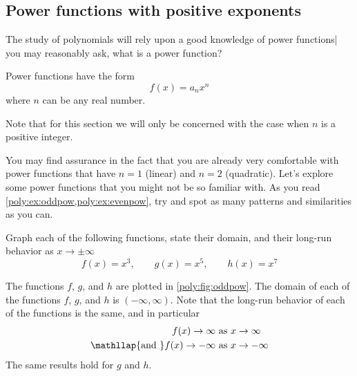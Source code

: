  \subsection*{Power functions with positive exponents}
	 The study of polynomials will rely upon a good knowledge
	 of power functions| you may reasonably ask, what is a power function?
	 \begin{pccdefinition}
		 Power functions have the form
		 \[
			 f(x) = a_n x^n
		 \]
		 where $n$ can be any real number.

		 Note that for this section we will only be concerned with the
		 case when $n$ is a positive integer.
	 \end{pccdefinition}

	 You may find assurance in the fact that you are already very comfortable
	 with power functions that have $n=1$ (linear) and $n=2$ (quadratic). Let's
	 explore some power functions that you might not be so familiar with.
	 As you read \cref{poly:ex:oddpow,poly:ex:evenpow}, try and spot
	 as many patterns and similarities as you can.

	 \begin{pccexample}
		 \label{poly:ex:oddpow}
		 Graph each of the following functions, state their domain, and their
		 long-run behavior as $x\rightarrow\pm\infty$
		 \[
			 f(x)=x^3,   \qquad  g(x)=x^5, \qquad h(x)=x^7
		 \]
		 \begin{pccsolution}
			 The functions $f$, $g$, and $h$ are plotted in \cref{poly:fig:oddpow}.
			 The domain of each of the functions $f$, $g$, and $h$ is $(-\infty,\infty)$. Note that
			 the long-run behavior of each of the functions is the same, and in particular
			 \begin{align*}
				 f(x)\rightarrow\infty                           & \text{ as } x\rightarrow\infty  \\
				 \mathllap{\text{and }}   f(x)\rightarrow-\infty & \text{ as } x\rightarrow-\infty
			 \end{align*}
			 The same results hold for $g$ and $h$.
		 \end{pccsolution}
	 \end{pccexample}

